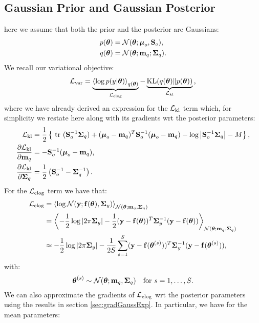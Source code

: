 \subsection{Gaussian Prior and Gaussian Posterior}
here we assume that both the prior and the posterior are Gaussians:
\begin{align}
p(\boldsymbol{ \theta }) &= \mathcal{N}(\boldsymbol{ \theta }; \boldsymbol{ \mu }_{o}, \mathbf{S}_{o}) \text{,}\\
q(\boldsymbol{ \theta }) &= \mathcal{N}(\boldsymbol{ \theta }; \mathbf{m}_{q}; \mathbf{\Sigma}_{q}) \text{.}
\end{align}
We recall our variational objective:
\begin{align}
\label{eq:lvartruefwd}
\lvar 	 = \underbrace{\Eb{\log p(y | \vectheta)}_{q(\vectheta)}}_{\lelog} -\underbrace{\kl{q(\vectheta)}{p(\vectheta)}}_{\lkl} \text{,}
\end{align}
where we have already derived an expression for the $\mathcal{L}_{\text{{kl}}}$ term which, for simplicity we restate here along with its gradients 
wrt the posterior parameters:
\begin{align}
\label{eq:lkltruefwd}
\lkl & = \frac{1}{2} 
	\left\{ 
		\trace(\Sigmao^{-1} \Sigmaq) + (\muo - \mq)^{T} \Sigmao^{-1} (\muo - \mq) - \log \det{\Sigmao^{-1} \Sigmaq} - M 
	\right\} \text{,} \\
\label{eq:gradmeanlkltruefwd}	
\deriv{\lkl}{\mq} &= -  \Sigmao^{-1} (\muo - \mq) \text{,} \\
\label{eq:gradcovlkltruefwd}	
\deriv{\lkl}{\Sigmaq} &= \frac{1}{2} \left( \Sigmao^{-1} - \Sigmaq^{-1} \right) \text{.}
\end{align}
%
For the $\mathcal{L}_{\text{{elog}}}$ term we have that:
\begin{align}
	\lelog &= 
	\Eb{\log \Normal(\vecy; \ftheta, \Sigmay)}_{\Normal(\vectheta; \mq, \Sigmaq)} \\
	&= \Eb{ - \frac{1}{2} \log \det{2 \pi \Sigmay} - \frac{1}{2} (\vecy - \ftheta)^{T}\Sigmay^{-1}  (\vecy - \ftheta) }_{\Normal(\vectheta; \mq, \Sigmaq)} \\
\label{eq:lelogtruefwd}	
	& \approx   - \frac{1}{2} \log \det{2 \pi \Sigmay} - \frac{1}{2S} \sum_{s =1}^{S} (\vecy - \fthetas)^{T}\Sigmay^{-1}  (\vecy - \fthetas) \text{,}
\end{align}
with: 
\begin{equation}
\boldsymbol{ \theta }^{(s)} \sim \mathcal{N}(\boldsymbol{ \theta }; \mathbf{m}_{q}, \mathbf{\Sigma}_{q})  \quad \text{for } s = 1, \ldots, S \text{.}
\end{equation}
%
We can also approximate the gradients of $\mathcal{L}_{\text{{elog}}}$ wrt the posterior parameters using the results in section \ref{sec:gradGaussExp}. 
In particular, we have for the mean parameters:
